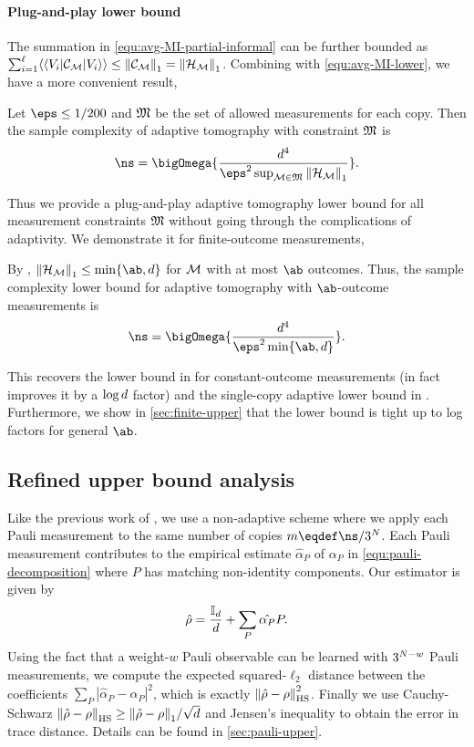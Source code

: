 \paragraph{Plug-and-play lower bound} The summation in \cref{equ:avg-MI-partial-informal} can be further bounded as $\sum_{i=1}^{\ell} \langle\langle V_i| {\mathcal{C}}_{\mathcal{M}} |V_i\rangle\rangle\le {\left\|{\mathcal{C}}_{\mathcal{M}}\right\|}_{1}={\left\|\mathcal{H}_{\mathcal{M}}\right\|}_{1}$.
Combining with \eqref{equ:avg-MI-lower}, we have a more convenient result,
\begin{corollary}
    Let $\eps\le 1/200$ and ${\mathfrak{M}}$ be the set of allowed measurements for each copy. Then the sample complexity of adaptive tomography with constraint ${\mathfrak{M}}$ is
    \[
    \ns = \bigOmega{\frac{\dims^4}{\eps^2\sup_{\POVM\in {\povmset}}\tracenorm{\Luders_{\POVM}}}}.
    \]
\end{corollary}
Thus we provide a plug-and-play adaptive tomography lower bound for all measurement constraints ${\mathfrak{M}}$ without going through the complications of adaptivity. We demonstrate it for finite-outcome measurements,
\begin{corollary} \label{cor:finite-lower}
    By \cite[Lemma 2.3]{liu2024restricted}, $\tracenorm{\Luders_{\POVM}}\le \min\{\ab, \dims\}$ for $\mathcal{M}$ with at most $\ab$ outcomes. Thus, the sample complexity lower bound for adaptive tomography with $\ab$-outcome measurements is
    \[
    \ns = \bigOmega{\frac{\dims^4}{\eps^2\min\{\ab, \dims\}}}.
    \]
\end{corollary}
This recovers the lower bound in \cite{lowe2022lower} for constant-outcome measurements (in fact improves it by a $\log d$ factor) and the single-copy adaptive lower bound in \cite{chen2023does}. Furthermore, we show in \cref{sec:finite-upper} that the lower bound is tight up to log factors for general $\ab$.


\subsection{Refined upper bound analysis}
Like the previous work of \cite{guctua2020fast}, we use a non-adaptive scheme where we apply each Pauli measurement to the same number of copies $m\eqdef\ns/3^{\nqubits}$. Each Pauli measurement contributes to the empirical estimate $\hat{\alpha}_P$ of $\alpha_P$ in \eqref{equ:pauli-decomposition} where $P$ has matching non-identity components. Our estimator is given by 
\[
\hat{\rho}=\frac{\mathbb{I}_d}{d}+\sum_{P}\hat{\alpha_P}P.
\]
Using the fact that a weight-$w$ Pauli observable can be learned with $3^{{N}-w}$ Pauli measurements, 
we compute the expected squared-$\ell_2$ distance between the coefficients ${\sum_{P}|\hat{\alpha}_P-\alpha_P|^2}$,
which is exactly ${\left\|\hat{\rho}-\rho\right\|}_{\text{HS}}^2$. 
Finally we use Cauchy-Schwarz ${\left\|\hat{\rho}-\rho\right\|}_{\text{HS}}\ge {\left\|\hat{\rho}-\rho\right\|}_{1}/\sqrt{d}$ and Jensen's inequality to obtain the error in trace distance. 
Details can be found in \cref{sec:pauli-upper}. 